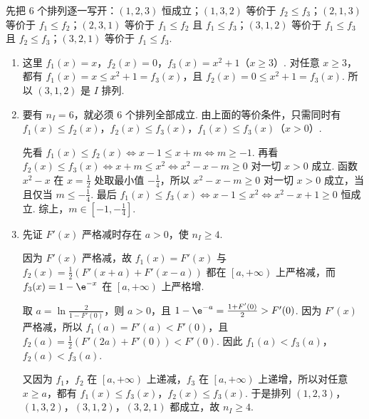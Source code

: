 \documentclass[UTF8,a4paper,oneside,11pt]{ctexbook}
\begin{document}
\begin{solution}
先把 \( 6 \) 个排列逐一写开：\( \left( 1,2,3 \right) \) 恒成立；\( \left( 1,3,2 \right) \) 等价于 \( f_2\le f_3 \)；\( \left( 2,1,3 \right) \) 等价于 \( f_1\le f_2 \)；\( \left( 2,3,1 \right) \) 等价于 \( f_1\le f_2 \) 且 \( f_1\le f_3 \)；\( \left( 3,1,2 \right) \) 等价于 \( f_1\le f_3 \) 且 \( f_2\le f_3 \)；\( \left( 3,2,1 \right) \) 等价于 \( f_1\le f_3 \).

\begin{enumerate}
\item 这里 \( f_1(x)=x \)，\( f_2(x)=0 \)，\( f_3(x)=x^2+1 \)（\( x\ge 3 \)）. 对任意 \( x\ge 3 \)，都有 \( f_1(x)=x\le x^2+1=f_3(x) \)，且 \( f_2(x)=0\le x^2+1=f_3(x) \). 所以 \( \left( 3,1,2 \right) \) 是 \(I\) 排列.

\item 要有 \( n_I=6 \)，就必须 \( 6 \) 个排列全部成立. 由上面的等价条件，只需同时有 \( f_1(x)\le f_2(x) \)，\( f_2(x)\le f_3(x) \)，\( f_1(x)\le f_3(x) \)（\( x>0 \)）.

先看 \( f_1(x)\le f_2(x)\iff x-1\le x+m\iff m\ge -1 \).
再看 \( f_2(x)\le f_3(x)\iff x+m\le x^2\iff x^2-x-m\ge 0 \) 对一切 \( x>0 \) 成立. 函数 \( x^2-x \) 在 \( x=\frac{1}{2} \) 处取最小值 \( -\frac{1}{4} \)，所以 \( x^2-x-m\ge 0 \) 对一切 \( x>0 \) 成立，当且仅当 \( m\le -\frac{1}{4} \).
最后 \( f_1(x)\le f_3(x)\iff x-1\le x^2\iff x^2-x+1\ge 0 \) 恒成立.
综上，\( m\in \left[ -1,-\frac{1}{4} \right] \).

\item 先证 \( F'(x) \) 严格减时存在 \( a>0 \)，使 \( n_I\ge 4 \).

因为 \( F'(x) \) 严格减，故 \( f_1(x)=F'(x) \) 与 \( f_2(x)=\frac{1}{2}\left( F'\left( x+a \right)+F'\left( x-a \right) \right) \) 都在 \( \left[ a,+\infty \right) \) 上严格减，而 \( f_3(x)=1-\e^{-x} \) 在 \( \left[ a,+\infty \right) \) 上严格增.

取 \( a=\ln \frac{2}{1-F'(0)} \)，则 \( a>0 \)，且 \( 1-\e^{-a}=\frac{1+F'(0)}{2}>F'(0) \). 因为 \( F'(x) \) 严格减，所以 \( f_1(a)=F'(a)<F'(0) \)，且 \( f_2(a)=\frac{1}{2}\left( F'\left( 2a \right)+F'(0) \right)<F'(0) \). 因此 \( f_1(a)<f_3(a) \)，\( f_2(a)<f_3(a) \).

又因为 \( f_1 \)，\( f_2 \) 在 \( \left[ a,+\infty \right) \) 上递减，\( f_3 \) 在 \( \left[ a,+\infty \right) \) 上递增，所以对任意 \( x\ge a \)，都有 \( f_1(x)\le f_3(x) \)，\( f_2(x)\le f_3(x) \). 于是排列 \( \left( 1,2,3 \right) \)，\( \left( 1,3,2 \right) \)，\( \left( 3,1,2 \right) \)，\( \left( 3,2,1 \right) \) 都成立，故 \( n_I\ge 4 \).


\end{enumerate}
\end{solution}
\end{document}
